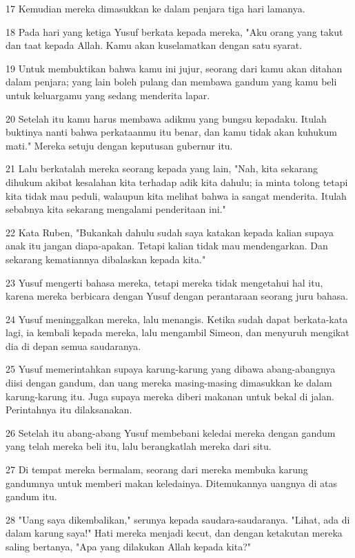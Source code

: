 \par 17 Kemudian mereka dimasukkan ke dalam penjara tiga hari lamanya.
\par 18 Pada hari yang ketiga Yusuf berkata kepada mereka, "Aku orang yang takut dan taat kepada Allah. Kamu akan kuselamatkan dengan satu syarat.
\par 19 Untuk membuktikan bahwa kamu ini jujur, seorang dari kamu akan ditahan dalam penjara; yang lain boleh pulang dan membawa gandum yang kamu beli untuk keluargamu yang sedang menderita lapar.
\par 20 Setelah itu kamu harus membawa adikmu yang bungsu kepadaku. Itulah buktinya nanti bahwa perkataanmu itu benar, dan kamu tidak akan kuhukum mati." Mereka setuju dengan keputusan gubernur itu.
\par 21 Lalu berkatalah mereka seorang kepada yang lain, "Nah, kita sekarang dihukum akibat kesalahan kita terhadap adik kita dahulu; ia minta tolong tetapi kita tidak mau peduli, walaupun kita melihat bahwa ia sangat menderita. Itulah sebabnya kita sekarang mengalami penderitaan ini."
\par 22 Kata Ruben, "Bukankah dahulu sudah saya katakan kepada kalian supaya anak itu jangan diapa-apakan. Tetapi kalian tidak mau mendengarkan. Dan sekarang kematiannya dibalaskan kepada kita."
\par 23 Yusuf mengerti bahasa mereka, tetapi mereka tidak mengetahui hal itu, karena mereka berbicara dengan Yusuf dengan perantaraan seorang juru bahasa.
\par 24 Yusuf meninggalkan mereka, lalu menangis. Ketika sudah dapat berkata-kata lagi, ia kembali kepada mereka, lalu mengambil Simeon, dan menyuruh mengikat dia di depan semua saudaranya.
\par 25 Yusuf memerintahkan supaya karung-karung yang dibawa abang-abangnya diisi dengan gandum, dan uang mereka masing-masing dimasukkan ke dalam karung-karung itu. Juga supaya mereka diberi makanan untuk bekal di jalan. Perintahnya itu dilaksanakan.
\par 26 Setelah itu abang-abang Yusuf membebani keledai mereka dengan gandum yang telah mereka beli itu, lalu berangkatlah mereka dari situ.
\par 27 Di tempat mereka bermalam, seorang dari mereka membuka karung gandumnya untuk memberi makan keledainya. Ditemukannya uangnya di atas gandum itu.
\par 28 "Uang saya dikembalikan," serunya kepada saudara-saudaranya. "Lihat, ada di dalam karung saya!" Hati mereka menjadi kecut, dan dengan ketakutan mereka saling bertanya, "Apa yang dilakukan Allah kepada kita?"
